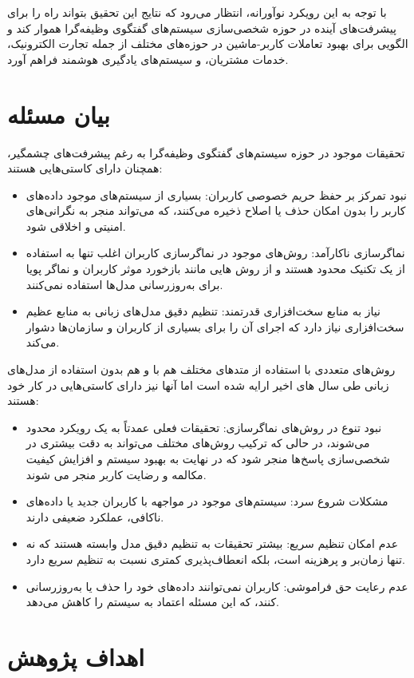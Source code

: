 با توجه به این رویکرد نوآورانه، انتظار می‌رود که نتایج این تحقیق بتواند راه را برای پیشرفت‌های آینده در حوزه شخصی‌سازی سیستم‌های گفتگوی وظیفه‌گرا هموار کند و الگویی برای بهبود تعاملات کاربر-ماشین در حوزه‌های مختلف از جمله تجارت الکترونیک، خدمات مشتریان، و سیستم‌های یادگیری هوشمند فراهم آورد.

\section{بیان مسئله}
تحقیقات موجود در حوزه سیستم‌های گفتگوی وظیفه‌گرا به رغم پیشرفت‌های چشمگیر، همچنان دارای کاستی‌هایی هستند:
\begin{itemize}
\item
نبود تمرکز بر حفظ حریم خصوصی کاربران: بسیاری از سیستم‌های موجود داده‌های کاربر را بدون امکان حذف یا اصلاح ذخیره می‌کنند، که می‌تواند منجر به نگرانی‌های امنیتی و اخلاقی شود.
\item
نماگر‌سازی ناکارآمد: روش‌های موجود در نماگر‌سازی کاربران اغلب تنها به استفاده از یک تکنیک محدود هستند و از روش هایی مانند بازخورد موثر کاربران و نماگر پویا برای به‌روزرسانی مدل‌ها استفاده نمی‌کنند.
\item
نیاز به منابع سخت‌افزاری قدرتمند: تنظیم دقیق مدل‌های زبانی به منابع عظیم سخت‌افزاری نیاز دارد که اجرای آن را برای بسیاری از کاربران و سازمان‌ها دشوار می‌کند.
\end{itemize}

روش‌های متعددی با استفاده از متدهای مختلف هم با و هم بدون استفاده از مدل‌های زبانی طی سال ‌های اخیر ارایه شده است اما آنها نیز دارای کاستی‌هایی در کار خود هستند:
\begin{itemize}
\item
نبود تنوع در روش‌های نماگر‌سازی: تحقیقات فعلی عمدتاً به یک رویکرد محدود می‌شوند، در حالی که ترکیب روش‌های مختلف می‌تواند به دقت بیشتری در شخصی‌سازی پاسخ‌ها منجر شود که در نهایت به بهبود سیستم و افزایش کیفیت مکالمه و رضایت کاربر منجر می شوند.
\item
مشکلات شروع سرد: سیستم‌های موجود در مواجهه با کاربران جدید یا داده‌های ناکافی، عملکرد ضعیفی دارند.
\item
عدم امکان تنظیم سریع: بیشتر تحقیقات به تنظیم دقیق مدل وابسته هستند که نه تنها زمان‌بر و پرهزینه است، بلکه انعطاف‌پذیری کمتری نسبت به تنظیم سریع دارد.
\item
عدم رعایت حق فراموشی: کاربران نمی‌توانند داده‌های خود را حذف یا به‌روزرسانی کنند، که این مسئله اعتماد به سیستم را کاهش می‌دهد.
\end{itemize}


\section{اهداف پژوهش}


